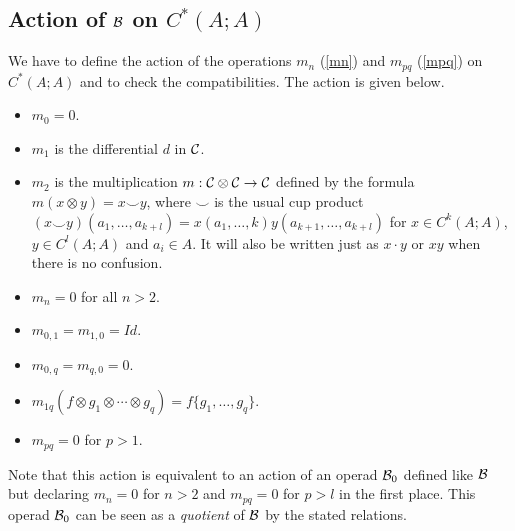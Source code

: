 \documentclass[TFM.tex]{subfiles}
\begin{document}
\subsection{Action of $\mathcal{B}$ on $C^*(A;A)$}
We have to define the action of the operations
$m_n$ (\ref{mn}) and $m_{pq}$ (\ref{mpq}) on $C^*(A;A)$ and to check the compatibilities. The action is given below.
\begin{itemize}
\item $m_0=0$.
\item $m_1$ is the differential $d$ in $\mathcal{C}$. 
\item $m_2$ is the multiplication $m:\mathcal{C}\otimes\mathcal{C}\to\mathcal{C}$ defined by the formula $m(x\otimes y)=x\smile y$, where $\smile$ is the usual cup product $(x\smile y)(a_1,\dots, a_{k+l})=x(a_1,\dots, k)y(a_{k+1},\dots, a_{k+l})$ for $x\in C^k(A;A)$, $y\in C^l(A;A)$ and $a_i\in A$. It will also be written just as $x\cdot y$ or $xy$ when there is no confusion.
\item $m_n=0$ for all $n>2$. 
\item $m_{0,1}=m_{1,0}=Id$.
\item $m_{0,q}=m_{q,0}=0$.
\item $m_{1q}(f\otimes g_1\otimes\cdots\otimes g_q)=f\{g_1,\dots, g_q\}$.
\item $m_{pq}=0$ for $p>1$.
\end{itemize}
Note that this action is equivalent to an action of an operad $\mathcal{B}_0$ defined like $\mathcal{B}$ but declaring $m_n=0$ for $n>2$ and $m_{pq}=0$ for $p>l$ in the first place. This operad $\mathcal{B}_0$ can be seen as a \emph{quotient} of $\mathcal{B}$ by the stated relations. 

%
\end{document}
